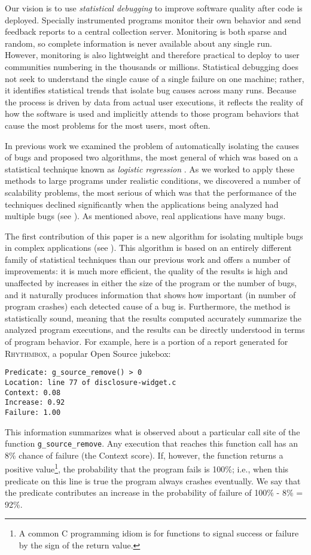 \documentclass[10pt]{acmconfbig}
\newcommand{\rhythmbox}{\textsc{Rhythmbox}\xspace}
\newcommand{\termdef}[1]{\textit{#1}}
\begin{document}
Our vision is to use \termdef{statistical debugging} to improve
software quality after code is deployed.  Specially instrumented
programs monitor their own behavior and send feedback reports to a
central collection server.  Monitoring is both sparse and random, so
complete information is never available about any single run.
However, monitoring is also lightweight and therefore practical to
deploy to user communities numbering in the thousands or millions.
Statistical debugging does not seek to understand the single cause of
a single failure on one machine; rather, it identifies statistical
trends that isolate bug causes across many runs.  Because the process
is driven by data from actual user executions, it reflects the reality
of how the software is used and implicitly attends to those program
behaviors that cause the most problems for the most users, most often.

In previous work we examined the problem of automatically isolating
the causes of bugs and proposed two algorithms, the most general of
which was based on a statistical technique known as {\em logistic
regression} \cite{PLDI`03*141,Zheng:2003:SDSP}.  As we worked to apply
these methods to large programs under realistic conditions, we
discovered a number of scalability problems, the most serious of which
was that the performance of the techniques declined significantly 
when the applications being analyzed had multiple bugs (see
).  As mentioned above, real applications
have many bugs.

The first contribution of this paper is a new algorithm for isolating
multiple bugs in complex applications (see ).  This algorithm 
is based on an entirely different family of statistical techniques than our previous work and offers
a number of improvements:
it is much more efficient, the quality of the
results is high and unaffected by increases in either the size of the program
or the number of bugs, and it naturally produces information
that shows how important (in number of program crashes) each detected
cause of a bug is.  Furthermore, the method is statistically sound, meaning that
the results computed accurately summarize the analyzed program 
executions, and the results can be directly understood in terms of program behavior.
For example, here is a portion of a report generated for \rhythmbox,
a popular Open Source jukebox:
\begin{verbatim}
Predicate: g_source_remove() > 0 
Location: line 77 of disclosure-widget.c
Context: 0.08
Increase: 0.92   
Failure: 1.00   
\end{verbatim}
This information summarizes what is observed about a particular call site of the function {\tt g\_source\_remove}.
Any execution that reaches this function call has an 8\% chance of failure (the Context score).  If, however,
the function returns a
positive value\footnote{A common C programming idiom is for functions to signal success or failure by the sign of the return value.}, the probability that the program fails is 100\%; i.e., when this predicate on this line is true the program always crashes eventually.  We say that the predicate contributes an increase in the probability of failure of 100\% - 8\% = 92\%.
\end{document}
